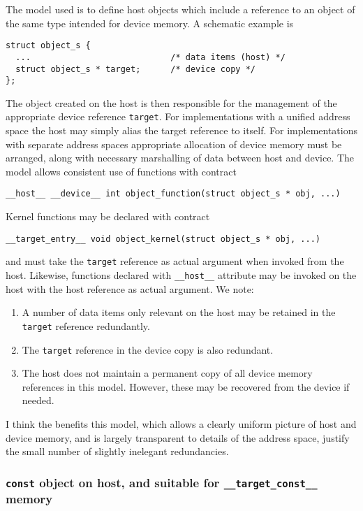 The model used is to define host objects which include a reference
to an object of the same type intended for device memory. A schematic
example is
\begin{lstlisting}
struct object_s { 
  ...                            /* data items (host) */
  struct object_s * target;      /* device copy */
};
\end{lstlisting}
The object created on the host is then responsible for the management
of the appropriate device reference \texttt{target}. For implementations
with a unified address space the host may simply alias the target
reference to itself. For implementations with separate address spaces
appropriate allocation of device memory must be arranged, along with
necessary marshalling of data between host and device. The model
allows consistent use of functions with contract
\begin{lstlisting}
__host__ __device__ int object_function(struct object_s * obj, ...)
\end{lstlisting}
Kernel functions may be declared with contract
\begin{lstlisting}
__target_entry__ void object_kernel(struct object_s * obj, ...)
\end{lstlisting}
and must take the \texttt{target} reference as actual argument when invoked
from the host. Likewise, functions declared with \texttt{\_\_host\_\_}
attribute may be
invoked on the host with the
host reference as actual argument.
We note:
\begin{enumerate}
\item
A number of data items only relevant on the host may be retained in
the \texttt{target} reference redundantly.
\item
The \texttt{target} reference in the device copy is also redundant.
\item
The host does not maintain a permanent copy of all device memory
references in this model. However, these may be recovered from the
device if needed.
\end{enumerate}
I think the benefits this model, which allows a clearly uniform picture
of host and device memory, and is largely transparent to details of the
address space, justify the small number of slightly inelegant redundancies.

\subsubsection{\texttt{const} object on host, and suitable for
\texttt{\_\_target\_const\_\_} memory}

